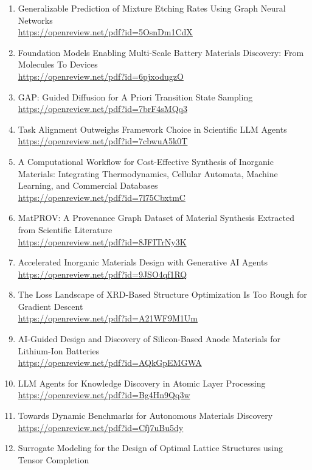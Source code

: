 \begin{enumerate}
        \url{https://openreview.net/pdf?id=57YLCp7n2V}
  \item Generalizable Prediction of Mixture Etching Rates Using Graph Neural Networks\\
        \url{https://openreview.net/pdf?id=5OsnDm1CdX}
  \item Foundation Models Enabling Multi-Scale Battery Materials Discovery: From Molecules To Devices\\
        \url{https://openreview.net/pdf?id=6pjxodugzO}
  \item GAP: Guided Diffusion for A Priori Transition State Sampling\\
        \url{https://openreview.net/pdf?id=7brF4sMQq3}
  \item Task Alignment Outweighs Framework Choice in Scientific LLM Agents\\
        \url{https://openreview.net/pdf?id=7cbwuA5k0T}
  \item A Computational Workflow for Cost-Effective Synthesis of Inorganic Materials: Integrating Thermodynamics, Cellular Automata, Machine Learning, and Commercial Databases\\
        \url{https://openreview.net/pdf?id=7l75CbxtmC}
  \item MatPROV: A Provenance Graph Dataset of Material Synthesis Extracted from Scientific Literature\\
        \url{https://openreview.net/pdf?id=8JFITrNy3K}
  \item Accelerated Inorganic Materials Design with Generative AI Agents\\
        \url{https://openreview.net/pdf?id=9JSO4qf1RQ}
  \item The Loss Landscape of XRD-Based Structure Optimization Is Too Rough for Gradient Descent\\
        \url{https://openreview.net/pdf?id=A21WF9M1Um}
  \item AI-Guided Design and Discovery of Silicon-Based Anode Materials for Lithium-Ion Batteries\\
        \url{https://openreview.net/pdf?id=AQkGpEMGWA}
  \item LLM Agents for Knowledge Discovery in Atomic Layer Processing\\
        \url{https://openreview.net/pdf?id=Bg4Hn9Qq3w}
  \item Towards Dynamic Benchmarks for Autonomous Materials Discovery\\
        \url{https://openreview.net/pdf?id=Cfj7uBu5dy}
  \item Surrogate Modeling for the Design of Optimal Lattice Structures using Tensor Completion\\

\end{enumerate}
